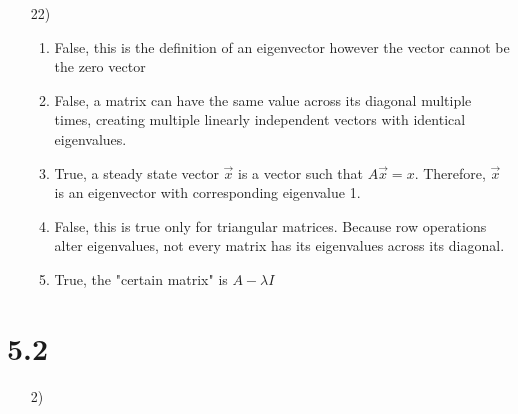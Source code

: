 \documentclass{article}
\begin{document}
\begin{enumerate}
  \item[22)]
    \begin{enumerate}
      \item
        False, this is the definition of an eigenvector however
        the vector cannot be the zero vector
      \item
        False, a matrix can have the same value across its 
        diagonal multiple times, creating multiple linearly 
        independent vectors with identical eigenvalues.
      \item 
        True, a steady state vector $\vec x$ is 
        a vector such that $A \vec x= x$.
        Therefore, $\vec x$ is an eigenvector with 
        corresponding eigenvalue 1.
      \item 
        False, this is true only for triangular matrices. 
        Because row operations alter eigenvalues, not every matrix
        has its eigenvalues across its diagonal. 
      \item 
        True, the "certain matrix" is $A - \lambda I$
  \end{enumerate}
\end{enumerate}
\section*{5.2}
\begin{enumerate}
  \item[2)]
\end{enumerate}
\end{document}
